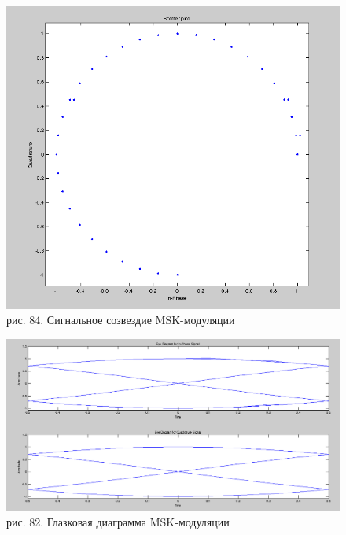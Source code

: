 \documentclass[10pt,a4paper]{report}
\begin{document}
\begin{figure}
\begin{center}
\includegraphics[width=150mm, scale = 0.9]{9_17}\newline
рис. 84. Сигнальное созвездие MSK-модуляции\newline
\end{center}
\end{figure}
\begin{figure}
\begin{center}
\includegraphics[width=150mm, scale = 0.9]{9_18}\newline
рис. 82. Глазковая диаграмма MSK-модуляции\newline
\end{center}
\end{figure}
\end{document}
